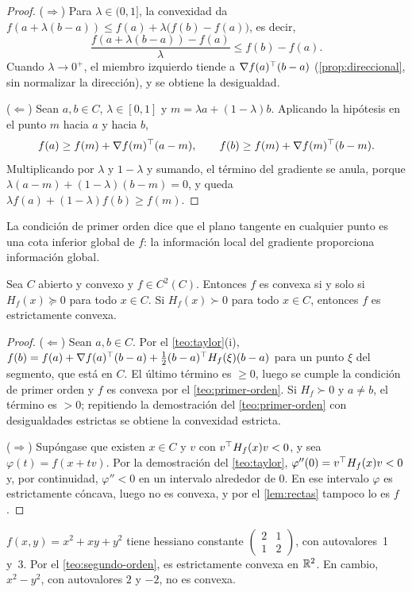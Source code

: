 \begin{proof}
($\Rightarrow$) Para $\lambda\in(0,1]$, la convexidad da $f(a+\lambda(b-a))\le f(a)+\lambda\bigl(f(b)-f(a)\bigr)$, es decir,
\[
\frac{f(a+\lambda(b-a))-f(a)}{\lambda}\le f(b)-f(a).
\]
Cuando $\lambda\to 0^{+}$, el miembro izquierdo tiende a $\nabla f(a)^{\top}(b-a)$ (\cref{prop:direccional}, sin normalizar la dirección), y se obtiene la desigualdad.

($\Leftarrow$) Sean $a,b\in C$, $\lambda\in[0,1]$ y $m=\lambda a+(1-\lambda)b$. Aplicando la hipótesis en el punto $m$ hacia $a$ y hacia $b$,
\[
f(a)\ge f(m)+\nabla f(m)^{\top}(a-m),\qquad f(b)\ge f(m)+\nabla f(m)^{\top}(b-m).
\]
Multiplicando por $\lambda$ y $1-\lambda$ y sumando, el término del gradiente se anula, porque $\lambda(a-m)+(1-\lambda)(b-m)=0$, y queda $\lambda f(a)+(1-\lambda)f(b)\ge f(m)$.
\end{proof}

La condición de primer orden dice que el plano tangente en cualquier punto es una cota inferior global de $f$: la información local del gradiente proporciona información global.

\begin{teorema}\label{teo:segundo-orden}
Sea $C$ abierto y convexo y $f\in C^{2}(C)$. Entonces $f$ es convexa si y solo si $H_f(x)\succeq 0$ para todo $x\in C$. Si $H_f(x)\succ 0$ para todo $x\in C$, entonces $f$ es estrictamente convexa.
\end{teorema}

\begin{proof}
($\Leftarrow$) Sean $a,b\in C$. Por el \cref{teo:taylor}(i), $f(b)=f(a)+\nabla f(a)^{\top}(b-a)+\tfrac12(b-a)^{\top} H_f(\xi)(b-a)$ para un punto $\xi$ del segmento, que está en $C$. El último término es $\ge 0$, luego se cumple la condición de primer orden y $f$ es convexa por el \cref{teo:primer-orden}. Si $H_f\succ 0$ y $a\ne b$, el término es $>0$; repitiendo la demostración del \cref{teo:primer-orden} con desigualdades estrictas se obtiene la convexidad estricta.

($\Rightarrow$) Supóngase que existen $x\in C$ y $v$ con $v^{\top} H_f(x)v<0$, y sea $\varphi(t)=f(x+tv)$. Por la demostración del \cref{teo:taylor}, $\varphi''(0)=v^{\top} H_f(x)v<0$ y, por continuidad, $\varphi''<0$ en un intervalo alrededor de $0$. En ese intervalo $\varphi$ es estrictamente cóncava, luego no es convexa, y por el \cref{lem:rectas} tampoco lo es $f$.
\end{proof}

\begin{ejemplo}\label{ej:cuad-convexa}
$f(x,y)=x^{2}+xy+y^{2}$ tiene hessiano constante $\begin{pmatrix}2&1\\1&2\end{pmatrix}$, con autovalores~1 y~3. Por el \cref{teo:segundo-orden}, es estrictamente convexa en $\mathbb{R}^{2}$. En cambio, $x^{2}-y^{2}$, con autovalores $2$ y $-2$, no es convexa.
\end{ejemplo}


